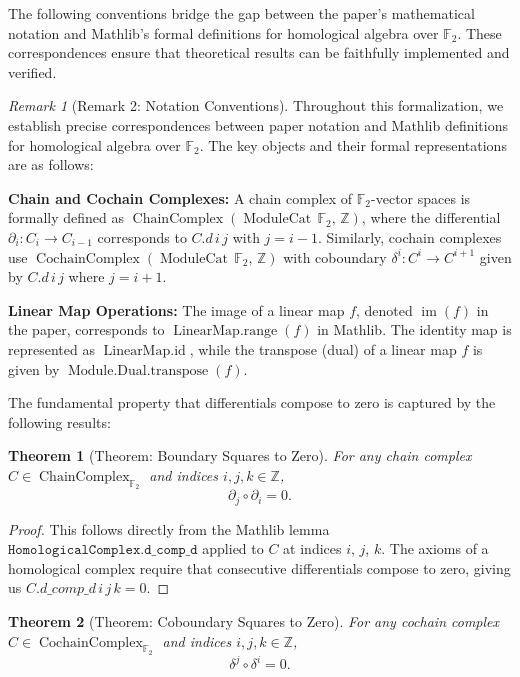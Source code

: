 \documentclass[11pt]{article}
\theoremstyle{plain}
\newtheorem*{theorem}{Theorem}
\theoremstyle{definition}
\theoremstyle{remark}
\newtheorem*{remark}{Remark}
\begin{document}
The following conventions bridge the gap between the paper's mathematical notation and Mathlib's formal definitions for homological algebra over $\mathbb{F}_2$. These correspondences ensure that theoretical results can be faithfully implemented and verified.

\begin{remark}[Remark 2: Notation Conventions]
Throughout this formalization, we establish precise correspondences between paper notation and Mathlib definitions for homological algebra over $\mathbb{F}_2$. The key objects and their formal representations are as follows:

\textbf{Chain and Cochain Complexes:} A chain complex of $\mathbb{F}_2$-vector spaces is formally defined as $\operatorname{ChainComplex}(\operatorname{ModuleCat}\,\mathbb{F}_2,\,\mathbb{Z})$, where the differential $\partial_i : C_i \to C_{i-1}$ corresponds to $C.d\,i\,j$ with $j = i-1$. Similarly, cochain complexes use $\operatorname{CochainComplex}(\operatorname{ModuleCat}\,\mathbb{F}_2,\,\mathbb{Z})$ with coboundary $\delta^i : C^i \to C^{i+1}$ given by $C.d\,i\,j$ where $j = i+1$.

\textbf{Linear Map Operations:} The image of a linear map $f$, denoted $\operatorname{im}(f)$ in the paper, corresponds to $\operatorname{LinearMap.range}(f)$ in Mathlib. The identity map is represented as $\operatorname{LinearMap.id}$, while the transpose (dual) of a linear map $f$ is given by $\operatorname{Module.Dual.transpose}(f)$.
\end{remark}

The fundamental property that differentials compose to zero is captured by the following results:

\begin{theorem}[Theorem: Boundary Squares to Zero]
For any chain complex $C \in \operatorname{ChainComplex}_{\mathbb{F}_2}$ and indices $i, j, k \in \mathbb{Z}$,
\[
\partial_j \circ \partial_i = 0.
\]
\end{theorem}

\begin{proof}
This follows directly from the Mathlib lemma $\texttt{HomologicalComplex.d\_comp\_d}$ applied to $C$ at indices $i$, $j$, $k$. The axioms of a homological complex require that consecutive differentials compose to zero, giving us $C.d\_comp\_d\,i\,j\,k = 0$.
\end{proof}

\begin{theorem}[Theorem: Coboundary Squares to Zero]
For any cochain complex $C \in \operatorname{CochainComplex}_{\mathbb{F}_2}$ and indices $i, j, k \in \mathbb{Z}$,
\[
\delta^j \circ \delta^i = 0.
\]
\end{theorem}
\end{document}
